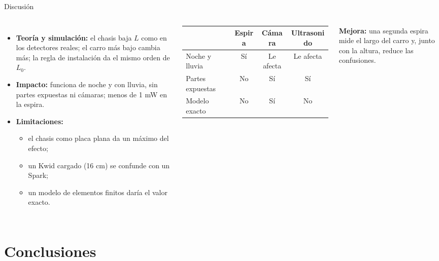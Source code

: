 \documentclass[aspectratio=169,10pt]{beamer}
\begin{document}
\begin{frame}{Discusión}

\begin{columns}[T]


\begin{itemize}
 \item \textbf{Teoría y simulación:} el chasis baja $L$ como en los detectores reales; el carro más bajo cambia
       más; la regla de instalación da el mismo orden de $L_0$.
 \item \textbf{Impacto:} funciona de noche y con lluvia, sin partes expuestas ni cámaras; menos de 1 mW en la espira.
 \item \textbf{Limitaciones:}
 \begin{itemize}
  \item el chasis como placa plana da un \alert{máximo} del efecto;
  \item un Kwid cargado (16 cm) se confunde con un Spark;
  \item un modelo de elementos finitos daría el valor exacto.
 \end{itemize}
\end{itemize}


\footnotesize
\begin{tabular}{@{}lccc@{}}
\toprule
 & Espira & Cámara & Ultrasonido \\
\midrule
Noche y lluvia & Sí & Le afecta & Le afecta \\
Partes expuestas & No & Sí & Sí \\
Modelo exacto & No & Sí & No \\
\bottomrule
\end{tabular}

\vspace{0.3cm}

\small
\textbf{Mejora:} una segunda espira mide el largo del carro y, junto con la altura, reduce las confusiones.

\end{columns}

\end{frame}


\section{Conclusiones}
\end{document}

